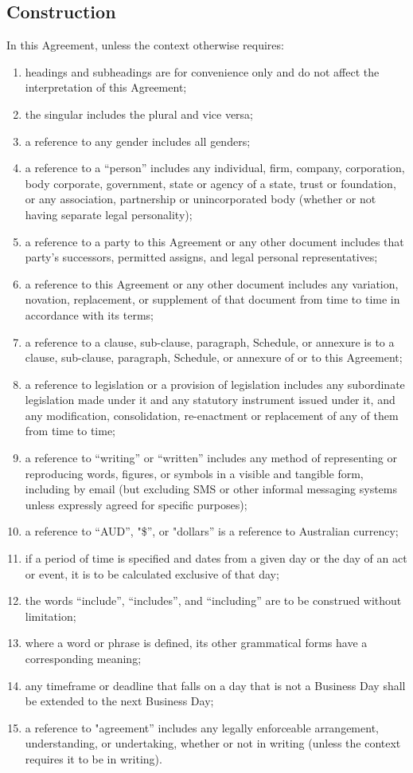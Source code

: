 \subsection{Construction}
In this Agreement, unless the context otherwise requires:
\begin{enumerate}[label=(\alph*)]
\item headings and subheadings are for convenience only and do not affect the interpretation of this Agreement;
\item the singular includes the plural and vice versa;
\item a reference to any gender includes all genders;
\item a reference to a ``person'' includes any individual, firm, company, corporation, body corporate, government, state or agency of a state, trust or foundation, or any association, partnership or unincorporated body (whether or not having separate legal personality);
\item a reference to a party to this Agreement or any other document includes that party's successors, permitted assigns, and legal personal representatives;
\item a reference to this Agreement or any other document includes any variation, novation, replacement, or supplement of that document from time to time in accordance with its terms;
\item a reference to a clause, sub-clause, paragraph, Schedule, or annexure is to a clause, sub-clause, paragraph, Schedule, or annexure of or to this Agreement;
\item a reference to legislation or a provision of legislation includes any subordinate legislation made under it and any statutory instrument issued under it, and any modification, consolidation, re-enactment or replacement of any of them from time to time;
\item a reference to ``writing'' or ``written'' includes any method of representing or reproducing words, figures, or symbols in a visible and tangible form, including by email (but excluding SMS or other informal messaging systems unless expressly agreed for specific purposes);
\item a reference to ``AUD'', "\$'', or "dollars'' is a reference to Australian currency;
\item if a period of time is specified and dates from a given day or the day of an act or event, it is to be calculated exclusive of that day;
\item the words ``include'', ``includes'', and ``including'' are to be construed without limitation;
\item where a word or phrase is defined, its other grammatical forms have a corresponding meaning;
\item any timeframe or deadline that falls on a day that is not a Business Day shall be extended to the next Business Day;
\item a reference to "agreement'' includes any legally enforceable arrangement, understanding, or undertaking, whether or not in writing (unless the context requires it to be in writing).
\end{enumerate}

